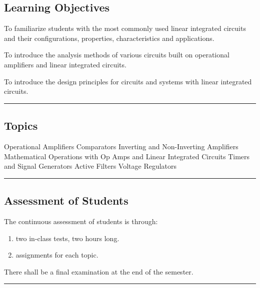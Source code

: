 \subsection*{Learning Objectives}
\begin{outline}

    \1 To familiarize students with the most commonly used linear integrated circuits and their configurations, properties, characteristics and applications.

    \1 To introduce the analysis methods of various circuits built on operational amplifiers and linear integrated circuits.

    \1 To introduce the design principles for circuits and systems with linear integrated circuits.

\end{outline}

\vspace{2ex}\hrule\vspace{2ex}

\subsection*{Topics}
\begin{outline}
    \1 Operational Amplifiers
    \1 Comparators
    \1 Inverting and Non-Inverting Amplifiers
    \1 Mathematical Operations with Op Amps and Linear Integrated Circuits
    \1 Timers and Signal Generators
    \1 Active Filters
    \1 Voltage Regulators
\end{outline}
\vspace{2ex} \hrule\vspace{2ex}

\subsection*{Assessment of Students}
\begin{outline}
    \1 The continuous assessment of students is through:
    \begin{enumerate}
        \item two in-class tests, two hours long.
        \item assignments for each topic.
    \end{enumerate}
    \1 There shall be a final examination at the end of the semester.
\end{outline}
\vspace{2ex}\hrule\vspace{2ex}

